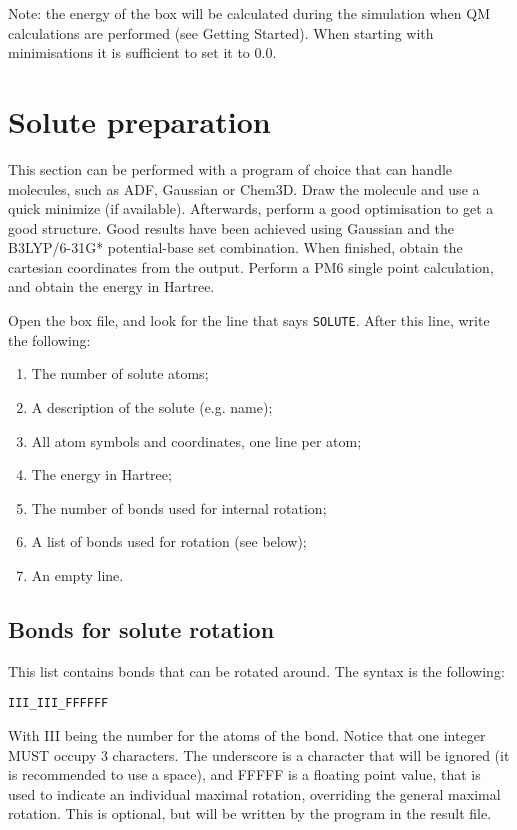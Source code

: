 Note: the energy of the box will be calculated during the simulation when QM 
calculations are performed (see Getting Started). When starting with 
minimisations it is sufficient to set it to $0.0$.

\section{Solute preparation}
This section can be performed with a program of choice that can handle 
molecules, such as ADF, Gaussian or Chem3D. Draw the molecule and use a quick 
minimize (if available). Afterwards, perform a good optimisation to get a good 
structure. Good results have been achieved using Gaussian and the B3LYP/6-31G* 
potential-base set combination.
When finished, obtain the cartesian coordinates from the output. Perform a PM6 
single point calculation, and obtain the energy in Hartree.

 Open the box file, and look for the line that says \verb|SOLUTE|. After this 
 line, write the following:

\begin{enumerate}
	\item The number of solute atoms;
	\item A description of the solute (e.g. name);
	\item All atom symbols and coordinates, one line per atom;
	\item The energy in Hartree;
	\item The number of bonds used for internal rotation;
	\item A list of bonds used for rotation (see below);
	\item An empty line.
\end{enumerate}

\subsection{Bonds for solute rotation}
This list contains bonds that can be rotated around. The syntax is the 
following:

\verb|III_III_FFFFFF|

With III being the number for the atoms of the bond. Notice that one integer 
MUST occupy 3 characters. The underscore is a character that will be ignored 
(it is recommended to use a space), 
and FFFFF is a floating point value, that is used to indicate an individual 
maximal rotation, overriding the general maximal rotation. This is optional, 
but will be written by the program in the result file.

